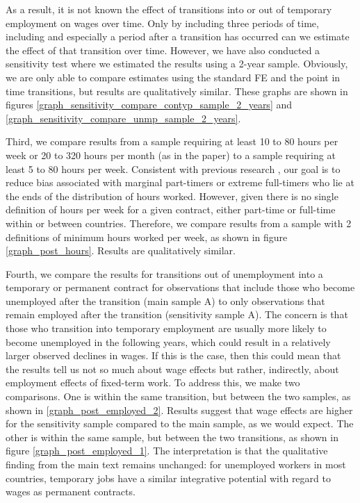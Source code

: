 As a result, it is not known the effect of transitions into or out of temporary employment on wages over time.  Only by including three periods of time, including and especially a period after a transition has occurred can we estimate the effect of that transition over time.  However, we have also conducted a sensitivity test where we estimated the results using a 2-year sample.  Obviously, we are only able to compare estimates using the standard FE and the point in time transitions, but results are qualitatively similar.  These graphs are shown in figures \ref{graph_sensitivity_compare_contyp_sample_2_years} and \ref{graph_sensitivity_compare_unmp_sample_2_years}.  

Third, we compare results from a sample requiring at least 10 to 80 hours per week or 20 to 320 hours per month (as in the paper) to a sample requiring at least 5 to 80 hours per week.  Consistent with previous research \citep{barbieri_dual_2018}, our goal is to reduce bias associated with marginal part-timers or extreme full-timers who lie at the ends of the distribution of hours worked.  However, given there is no single definition of hours per week for a given contract, either part-time or full-time within or between countries.  Therefore, we compare results from a sample with 2 definitions of minimum hours worked per week, as shown in figure \ref{graph_post_hours}.  Results are qualitatively similar. 

Fourth, we compare the results for transitions out of unemployment into a temporary or permanent contract for observations that include those who become unemployed after the transition (main sample A) to only observations that remain employed after the transition (sensitivity sample A).  The concern is that those who transition into temporary employment are usually more likely to become unemployed in the following years, which could result in a relatively larger observed declines in wages. If this is the case, then this could mean that the results tell us not so much about wage effects but rather, indirectly, about employment effects of fixed-term work. To address this, we make two comparisons.  One is within the same transition, but between the two samples, as shown in \ref{graph_post_employed_2}.  Results suggest that wage effects are higher for the sensitivity sample compared to the main sample, as we would expect.  The other is within the same sample, but between the two transitions, as shown in figure \ref{graph_post_employed_1}.  The interpretation is that the qualitative finding from the main text remains unchanged: for unemployed workers in most countries, temporary jobs have a similar integrative potential with regard to wages as permanent contracts.  

